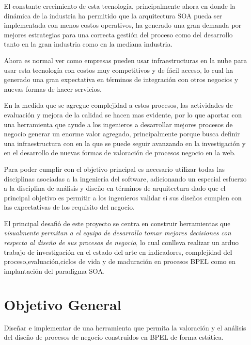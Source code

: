 \documentclass[spanish]{article}
\begin{document}
El constante crecimiento de esta tecnología, principalmente ahora
en donde la dinámica de la industria ha permitido que la arquitectura
SOA pueda ser implementada con menos costos operativos, ha generado
una gran demanda por mejores estrategias para una correcta gestión
del proceso como del desarrollo tanto en la gran industria como en
la mediana industria.

Ahora es normal ver como empresas pueden usar infraestructuras en
la nube para usar esta tecnología con costos muy competitivos y de
fácil acceso, lo cual ha generado una gran expectativa en términos
de integración con otros negocios y nuevas formas de hacer servicios.

En la medida que se agregue complejidad a estos procesos, las actividades
de evaluación y mejora de la calidad se hacen mas evidente, por lo
que aportar con una herramienta que ayude a los ingenieros a desarrollar
mejores procesos de negocio generar un enorme valor agregado, principalmente
porque busca definir una infraestructura con en la que se puede seguir
avanzando en la investigación y en el desarrollo de nuevas formas
de valoración de procesos negocio en la web.

Para poder cumplir con el objetivo principal es necesario utilizar
todas las disciplinas asociadas a la ingeniería del software, adicionando
un especial esfuerzo a la disciplina de análisis y diseño en términos
de arquitectura dado que el principal objetivo es permitir a los ingenieros
validar si sus diseños cumplen con las expectativas de los requisito
del negocio.

El principal desafió de este proyecto se centra en construir herramientas
que \emph{visualmente permitan a el equipo de desarrollo tomar mejores
decisiones con respecto al diseño de sus procesos de negocio}, lo
cual conlleva realizar un arduo trabajo de investigación en el estado
del arte en indicadores, complejidad del proceso,evaluación,ciclos
de vida y de maduración en procesos BPEL como en implantación del
paradigma SOA.


\section{Objetivo General}

Diseñar e implementar de una herramienta que permita la valoración
y el análisis del diseño de procesos de negocio construidos en BPEL
de forma estática.
\end{document}
